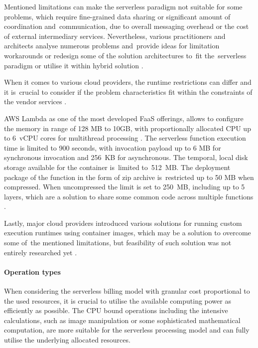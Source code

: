 Mentioned limitations can make the serverless paradigm not suitable for some problems, which require fine-grained data sharing or significant amount of coordination and~communication, due to overall messaging overhead or the cost of external intermediary services.
Nevertheless, various practitioners and architects analyse numerous problems and~provide ideas for limitation workarounds or redesign some of the solution architectures to~fit the~serverless paradigm or utilise it within hybrid solution \cite{BerkeleyServerless}.

When it comes to various cloud providers, the runtime restrictions can differ and it is~crucial to consider if the problem characteristics fit within the constraints of the vendor services \cite{LeveragingServerlessCloudComputingArchitectures}.

AWS Lambda \cite{AWSLambdaQuotas} as one of the most developed FaaS offerings, allows to configure the memory in range of 128 MB to 10GB, with proportionally allocated CPU up to 6~vCPU cores for multithread processing \cite{AWSLambdaRAMandCPU}.
The serverless function execution time is limited to 900 seconds, with invocation payload up to 6 MB for synchronous invocation and 256~KB for asynchronous.
The temporal, local disk storage available for the container is~limited to~512~MB.
The deployment package of the function in the form of zip archive is~restricted up to 50 MB when compressed. When uncompressed the limit is set to 250~MB, including up to 5 layers, which are a solution to share some common code across multiple functions \cite{EvaluationOfServerlessApplicationProgrammingModel}.

Lastly, major cloud providers introduced various solutions for running custom execution runtimes using container images, which may be a solution to overcome some of~the mentioned limitations, but feasibility of such solution was not entirely researched yet \cite{AWSLambdaContainerImageSupport}.

\paragraph{Operation types} \label{chapter:serverless-suitability-operation-types}

When considering the serverless billing model with granular cost proportional to the used resources, it is crucial to utilise the available computing power as efficiently as possible. The CPU bound operations including the intensive calculations, such as image manipulation or some sophisticated mathematical computation, are more suitable for the serverless processing model and can fully utilise the underlying allocated resources.

